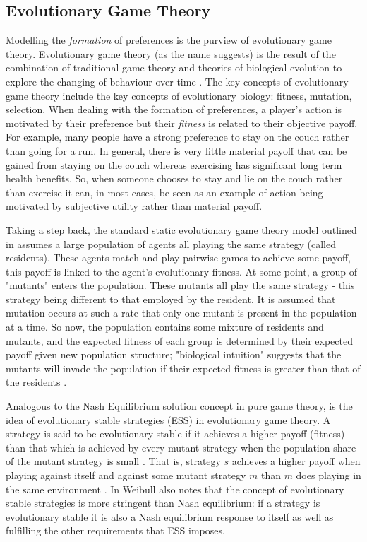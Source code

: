 \documentclass[11pt]{article}
\newcommand*{\np}{\par\noindent\newline}
\begin{document}
\subsection{Evolutionary Game Theory}\label{evo_games}
Modelling the \textit{formation} of preferences is the purview of evolutionary game theory. Evolutionary game theory (as
the name suggests) is the result of the combination of traditional game theory and theories of biological evolution to
explore the changing of behaviour over time \citep{tanimoto_fundamentals_2015}. The key concepts of evolutionary game
theory include the key concepts of evolutionary biology: fitness, mutation, selection. When dealing with the
formation of preferences, a player's action is motivated by their preference but their \textit{fitness} is related to
their objective payoff. For example, many people have a strong preference to stay on the couch rather than going for a
run. In general, there is very little material payoff that can be gained from staying on the couch whereas exercising
has significant long term health benefits. So, when someone chooses to stay and lie on the couch rather than exercise it
can, in most cases, be seen as an example of action being motivated by subjective utility rather than material payoff.

\np Taking a step back, the standard static evolutionary game theory model outlined in \citet{weibull_introduction_1992}
assumes a large population of agents all playing the same strategy (called residents). These agents match and play
pairwise games to achieve some payoff, this payoff is linked to the agent's evolutionary fitness. At some point, a group
of "mutants" enters the population. These mutants all play the same strategy - this strategy being different to that
employed by the resident. It is assumed that mutation occurs at such a rate that only one mutant is present in the
population at a time. So now, the population contains some mixture of residents and mutants, and the expected fitness of
each group is determined by their expected payoff given new population structure; "biological intuition" suggests that
the mutants will invade the population if their expected fitness is greater than that of the residents \citep[~p. 9]{weibull_introduction_1992}.

\np Analogous to the Nash Equilibrium solution concept in pure game theory, is the idea of evolutionary stable
strategies (ESS) in evolutionary game theory. A strategy is said to be evolutionary stable if it achieves a higher
payoff (fitness) than that which is achieved by every mutant strategy when the population share of the mutant strategy
is small \citep{weibull_introduction_1992}. That is, strategy $s$ achieves a higher payoff when playing against itself
and against some mutant strategy $m$ than $m$ does playing in the same environment \citep{shoham_multiagent_2008}. In
\citep{weibull_introduction_1992} Weibull also notes that the concept of evolutionary stable strategies is more
stringent than Nash equilibrium: if a strategy is evolutionary stable it is also a Nash equilibrium response to itself
as well as fulfilling the other requirements that ESS imposes.
\end{document}
